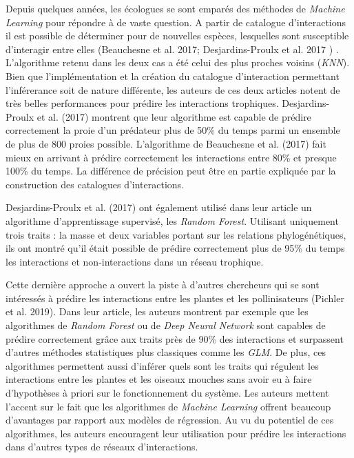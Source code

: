 \documentclass[
  12pt,
  a4paper,
  oneside]{report}
\begin{document}
Depuis quelques années, les écologues se sont emparés des méthodes de
\emph{Machine Learning} pour répondre à de vaste question. A partir de
catalogue d'interactions il est possible de déterminer pour de nouvelles
espèces, lesquelles sont susceptible d'interagir entre elles (Beauchesne
et al. 2017; Desjardins-Proulx et al. 2017 ) . L'algorithme retenu dans
les deux cas a été celui des plus proches voisins (\emph{KNN}). Bien que
l'implémentation et la création du catalogue d'interaction permettant
l'inférerance soit de nature différente, les auteurs de ces deux
articles notent de très belles performances pour prédire les
interactions trophiques. Desjardins-Proulx et al. (2017) montrent que
leur algorithme est capable de prédire correctement la proie d'un
prédateur plus de 50\% du temps parmi un ensemble de plus de 800 proies
possible. L'algorithme de Beauchesne et al. (2017) fait mieux en
arrivant à prédire correctement les interactions entre 80\% et presque
100\% du temps. La différence de précision peut être en partie expliquée
par la construction des catalogues d'interactions.

Desjardins-Proulx et al. (2017) ont également utilisé dans leur article
un algorithme d'apprentissage supervisé, les \emph{Random Forest}.
Utilisant uniquement trois traits : la masse et deux variables portant
sur les relations phylogénétiques, ils ont montré qu'il était possible
de prédire correctement plus de 95\% du temps les interactions et
non-interactions dans un réseau trophique.

Cette dernière approche a ouvert la piste à d'autres chercheurs qui se
sont intéressés à prédire les interactions entre les plantes et les
pollinisateurs (Pichler et al. 2019). Dans leur article, les auteurs
montrent par exemple que les algorithmes de \emph{Random Forest} ou de
\emph{Deep Neural Network} sont capables de prédire correctement grâce
aux traits près de 90\% des interactions et surpassent d'autres méthodes
statistiques plus classiques comme les \emph{GLM}. De plus, ces
algorithmes permettent aussi d'inférer quels sont les traits qui
régulent les interactions entre les plantes et les oiseaux mouches sans
avoir eu à faire d'hypothèses à priori sur le fonctionnement du système.
Les auteurs mettent l'accent sur le fait que les algorithmes de
\emph{Machine Learning} offrent beaucoup d'avantages par rapport aux
modèles de régression. Au vu du potentiel de ces algorithmes, les
auteurs encouragent leur utilisation pour prédire les interactions dans
d'autres types de réseaux d'interactions.
\end{document}
